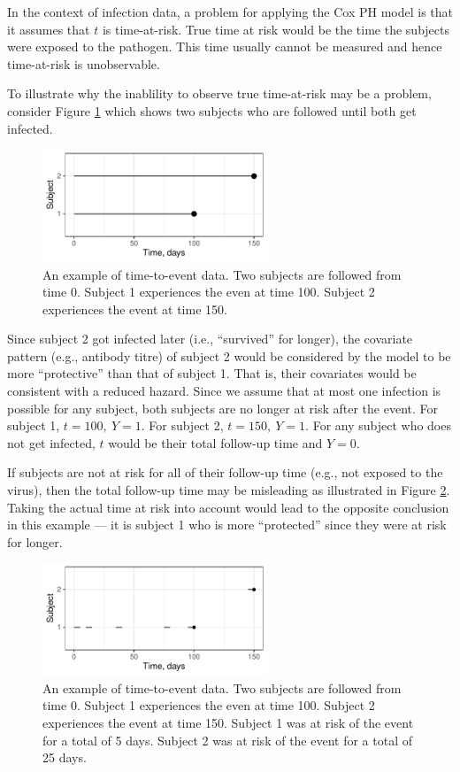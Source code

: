 In the context of infection data, a problem for applying the Cox PH model is that it assumes that $t$ is time-at-risk. True time at risk would be the time the subjects were exposed to the pathogen. This time usually cannot be measured and hence time-at-risk is unobservable.

To illustrate why the inablility to observe true time-at-risk may be a problem, consider Figure \ref{CoxExampleFull} which shows two subjects who are followed until both get infected.

\begin{figure}[htp]
	\centering
	\includegraphics[width=0.6\textwidth]{../curve-cox/timeplot_1_light.pdf}
	\caption{
	An example of time-to-event data. Two subjects are followed from time 0. Subject 1 experiences the even at time 100. Subject 2 experiences the event at time 150.
	}
	\label{CoxExampleFull}
\end{figure}

Since subject 2 got infected later (i.e., ``survived'' for longer), the covariate pattern (e.g., antibody titre) of subject 2 would be considered by the model to be more ``protective'' than that of subject 1. That is, their covariates would be consistent with a reduced hazard. Since we assume that at most one infection is possible for any subject, both subjects are no longer at risk after the event. For subject 1, $t=100,\ Y=1$. For subject 2, $t=150,\ Y=1$. For any subject who does not get infected, $t$ would be their total follow-up time and $Y=0$.

If subjects are not at risk for all of their follow-up time (e.g., not exposed to the virus), then the total follow-up time may be misleading as illustrated in Figure \ref{CoxExamplePartial}. Taking the actual time at risk into account would lead to the opposite conclusion in this example --- it is subject 1 who is more ``protected'' since they were at risk for longer.

\begin{figure}[htp]
	\centering
	\includegraphics[width=0.6\textwidth]{../curve-cox/timeplot_2_light.pdf}
	\caption{
	An example of time-to-event data. Two subjects are followed from time 0. Subject 1 experiences the even at time 100. Subject 2 experiences the event at time 150. Subject 1 was at risk of the event for a total of 5 days. Subject 2 was at risk of the event for a total of 25 days.
	}
	\label{CoxExamplePartial}
\end{figure}

